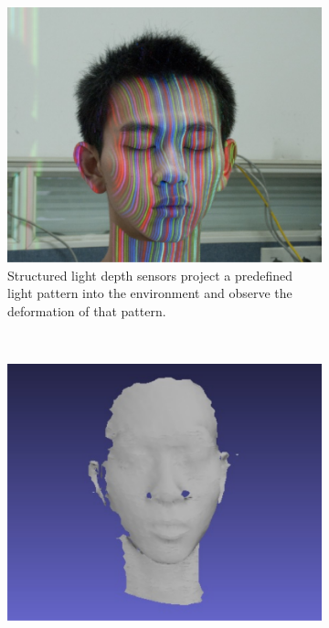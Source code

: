 \begin{figure}[H]
    \centering
    \begin{subfigure}[t]{0.45\textwidth}
        \includegraphics[width=\textwidth]{chapter03/img/depth_pattern_face.png}
        \caption{Structured light depth sensors project a predefined light pattern into the environment and observe the deformation of that pattern\cite{sl_depthsensor_calibration}.}
    \end{subfigure}~
    \begin{subfigure}[t]{0.45\textwidth}
        \includegraphics[width=\textwidth]{chapter03/img/depth_face_reconstructed.png}

\end{subfigure}
\end{figure}
